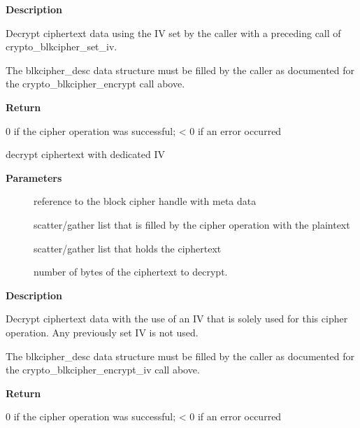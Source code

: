 \documentclass[a4paper,8pt,english]{sphinxmanual}
\begin{document}
\textbf{Description}

Decrypt ciphertext data using the IV set by the caller with a preceding
call of crypto\_blkcipher\_set\_iv.

The blkcipher\_desc data structure must be filled by the caller as documented
for the crypto\_blkcipher\_encrypt call above.

\textbf{Return}

0 if the cipher operation was successful; \textless{} 0 if an error occurred

\begin{fulllineitems}
\label{crypto/api-skcipher:c.crypto_blkcipher_decrypt_iv}
decrypt ciphertext with dedicated IV

\end{fulllineitems}


\textbf{Parameters}
\begin{description}
\item[{}] \leavevmode
reference to the block cipher handle with meta data

\item[{}] \leavevmode
scatter/gather list that is filled by the cipher operation with the
plaintext

\item[{}] \leavevmode
scatter/gather list that holds the ciphertext

\item[{}] \leavevmode
number of bytes of the ciphertext to decrypt.

\end{description}

\textbf{Description}

Decrypt ciphertext data with the use of an IV that is solely used for this
cipher operation. Any previously set IV is not used.

The blkcipher\_desc data structure must be filled by the caller as documented
for the crypto\_blkcipher\_encrypt\_iv call above.

\textbf{Return}

0 if the cipher operation was successful; \textless{} 0 if an error occurred
\end{document}
